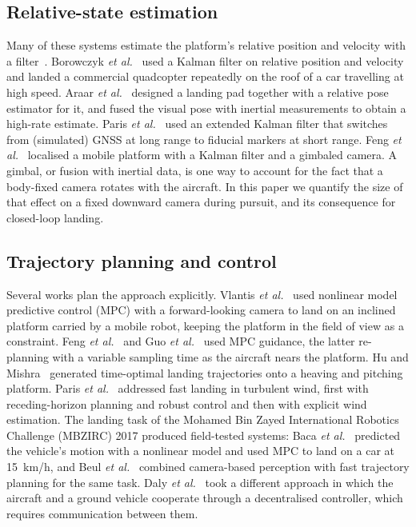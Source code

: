 \documentclass[conference]{IEEEtran}
\begin{document}
\subsection{Relative-state estimation}
Many of these systems estimate the platform's relative position and velocity with a
filter~\cite{kalman1960new}. Borowczyk \emph{et al.}~\cite{borowczyk2017autonomous} used a
Kalman filter on relative position and velocity and landed a commercial quadcopter repeatedly
on the roof of a car travelling at high speed. Araar \emph{et al.}~\cite{araar2017vision}
designed a landing pad together with a relative pose estimator for it, and fused the visual
pose with inertial measurements to obtain a high-rate estimate. Paris
\emph{et al.}~\cite{paris2020dynamic} used an extended Kalman filter that switches from
(simulated) GNSS at long range to fiducial markers at short range. Feng
\emph{et al.}~\cite{feng2018autonomous} localised a mobile platform with a Kalman filter and a
gimbaled camera. A gimbal, or fusion with inertial data, is one way to account for the fact that a body-fixed
camera rotates with the aircraft. In this paper we quantify the size of that effect on a fixed
downward camera during pursuit, and its consequence for closed-loop landing.

\subsection{Trajectory planning and control}
Several works plan the approach explicitly. Vlantis \emph{et al.}~\cite{vlantis2015quadrotor}
used nonlinear model predictive control (MPC) with a forward-looking camera to land on an
inclined platform carried by a mobile robot, keeping the platform in the field of view as a
constraint. Feng \emph{et al.}~\cite{feng2018autonomous} and Guo
\emph{et al.}~\cite{guo2022autonomous} used MPC guidance, the latter re-planning with a
variable sampling time as the aircraft nears the platform. Hu and Mishra~\cite{hu2019time}
generated time-optimal landing trajectories onto a heaving and pitching platform. Paris
\emph{et al.}~\cite{paris2020dynamic,paris2021autonomous} addressed fast landing in turbulent
wind, first with receding-horizon planning and robust control and then with explicit wind
estimation. The landing task of the Mohamed Bin Zayed International Robotics Challenge (MBZIRC)
2017 produced field-tested systems: Baca \emph{et al.}~\cite{baca2019autonomous} predicted the
vehicle's motion with a nonlinear model and used MPC to land on a car at \SI{15}{km/h}, and Beul
\emph{et al.}~\cite{beul2019team} combined camera-based perception with fast trajectory
planning for the same task. Daly \emph{et al.}~\cite{daly2015coordinated} took a different
approach in which the aircraft and a ground vehicle cooperate through a decentralised
controller, which requires communication between them.
\end{document}
